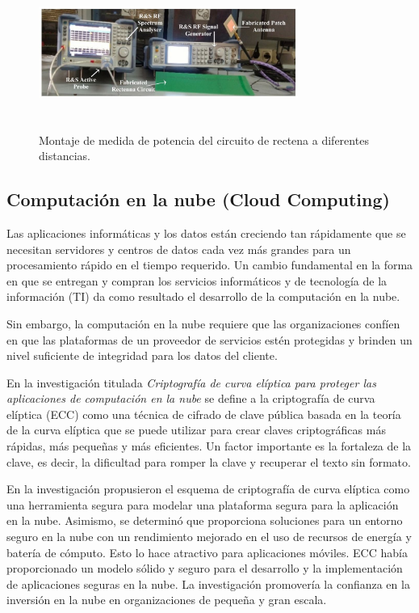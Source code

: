 \documentclass[10pt,journal]{IEEEtran}
\begin{document}
\begin{figure}[H]
 \begin{center}
       \includegraphics[width=8.5cm, height=5cm]{figuras/1.JPG}
      \caption{Montaje de medida de potencia del circuito de rectena a diferentes distancias.}
      \label{f1} 
      \end{center}
\end{figure}

\subsection{\textbf{Computación en la nube (Cloud Computing)}}
Las aplicaciones informáticas y los datos están creciendo tan rápidamente que se necesitan servidores y centros de datos cada vez más grandes para un procesamiento rápido en el tiempo requerido. Un cambio fundamental en la forma en que se entregan y compran los servicios informáticos y de tecnología de la información (TI) da como resultado el desarrollo de la computación en la nube. \par Sin embargo, la computación en la nube requiere que las organizaciones confíen en que las plataformas de un proveedor de servicios estén protegidas y brinden un nivel suficiente de integridad para los datos del cliente.\par
En la investigación titulada \textit{Criptografía de curva elíptica para proteger las aplicaciones de computación en la nube} \citep{eliptic} se define a la criptografía de curva elíptica (ECC) como una técnica de cifrado de clave pública basada en la teoría de la curva elíptica que se puede utilizar para crear claves criptográficas más rápidas, más pequeñas y más eficientes. Un factor importante es la fortaleza de la clave, es decir, la dificultad para romper la clave y recuperar el texto sin formato.\par En la investigación propusieron el esquema de criptografía de curva elíptica como una herramienta segura para modelar una plataforma segura para la aplicación en la nube.
Asimismo, se determinó que proporciona soluciones para un entorno seguro en la nube con un rendimiento mejorado en el uso de recursos de energía y batería de cómputo. Esto lo hace atractivo para aplicaciones móviles. ECC había proporcionado un modelo sólido y seguro para el desarrollo y la implementación de aplicaciones seguras en la nube. La investigación promovería la confianza en la inversión en la nube en organizaciones de pequeña y gran escala.
\end{document}
